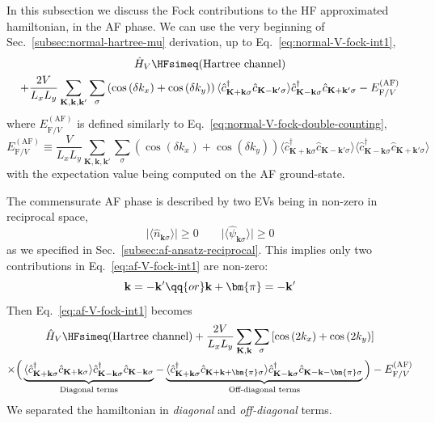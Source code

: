In this subsection we discuss the Fock contributions to the HF approximated hamiltonian, in the AF phase. We can use the very beginning of Sec.~\ref{subsec:normal-hartree-mu} derivation, up to Eq.~\eqref{eq:normal-V-fock-int1},
\begin{multline}
	\hat H_V \HFsimeq (\text{Hartree channel}) \\
	+ \frac{2V}{L_x L_y} \sum_{\mathbf{K}, \mathbf{k}, \mathbf{k}'} \sum_\sigma \left(
	\cos \left(
	\delta k_x
	\right)	+ \cos \left(
	\delta k_y
	\right)	
	\right)
	\langle
	\hat c_{\mathbf{K}+\mathbf{k} \sigma}^\dagger 
	\hat c_{\mathbf{K}-\mathbf{k}' \sigma}
	\rangle
	\hat c_{\mathbf{K}-\mathbf{k} \sigma}^\dagger  \hat c_{\mathbf{K}+\mathbf{k}'\sigma} - E_{\mathrm{F}/V}^{(\mathrm{AF})} \label{eq:af-V-fock-int1}
\end{multline}
where $E_{\mathrm{F}/V}^{(\mathrm{AF})}$ is defined similarly to Eq.~\eqref{eq:normal-V-fock-double-counting},
\begin{equation}\label{eq:af-V-fock-double-counting}
	E_{\mathrm{F}/V}^{(\mathrm{AF})} \equiv \frac{V}{L_x L_y} \sum_{\mathbf{K}, \mathbf{k}, \mathbf{k}'} \sum_\sigma \left(
	\cos \left(
	\delta k_x
	\right)	+ \cos \left(
	\delta k_y
	\right)	
	\right)
	\langle
	\hat c_{\mathbf{K}+\mathbf{k} \sigma}^\dagger 
	\hat c_{\mathbf{K}-\mathbf{k}' \sigma}
	\rangle \langle
	\hat c_{\mathbf{K}-\mathbf{k} \sigma}^\dagger  \hat c_{\mathbf{K}+\mathbf{k}'\sigma} 
	\rangle
\end{equation}
with the expectation value being computed on the AF ground-state.

The commensurate AF phase is described by two EVs being in non-zero in reciprocal space,
\[
	\big| 
	\langle
	\hat n_{\mathbf{k}\sigma}
	\rangle
	\big| \ge 0
	\qquad
	\big| 
	\langle
	\hat \psi_{\mathbf{k}\sigma}
	\rangle
	\big| \ge 0
\]
as we specified in Sec.~\ref{subsec:af-ansatz-reciprocal}. This implies only two contributions in Eq.~\eqref{eq:af-V-fock-int1} are non-zero:
\[
	\mathbf{k} = -\mathbf{k}'
	\qq{or}
	\mathbf{k}+\bm{\pi} = -\mathbf{k}'
\]
Then Eq.~\eqref{eq:af-V-fock-int1} becomes
\begin{multline}
	\hat H_V \HFsimeq (\text{Hartree channel}) + \frac{2V}{L_x L_y} \sum_{\mathbf{K}, \mathbf{k}} \sum_\sigma \left[
	\cos \left(
	2k_x
	\right)	+ \cos \left(
	2k_y
	\right)	
	\right]	\\
	\times \Big(
	\underbrace{
		\langle
		\hat c_{\mathbf{K}+\mathbf{k} \sigma}^\dagger 
		\hat 	c_{\mathbf{K}+\mathbf{k} \sigma}
		\rangle
		\hat c_{\mathbf{K}-\mathbf{k} \sigma}^\dagger  \hat c_{\mathbf{K}-\mathbf{k}\sigma}
	}_\text{Diagonal terms}
	-
	\underbrace{
		\langle
		\hat c_{\mathbf{K}+\mathbf{k} \sigma}^\dagger 
		\hat 	c_{\mathbf{K}+\mathbf{k}+\bm{\pi} \sigma}
		\rangle
		\hat c_{\mathbf{K}-\mathbf{k} \sigma}^\dagger  \hat c_{\mathbf{K}-\mathbf{k}-\bm{\pi}\sigma}
	}_\text{Off-diagonal terms} \Big) - E_{\mathrm{F}/V}^{(\mathrm{AF})}
	\label{eq:af-V-fock-int2}
\end{multline}
We separated the hamiltonian in \textit{diagonal} and \textit{off-diagonal} terms.

